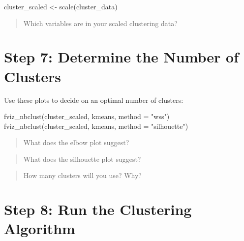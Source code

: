 \documentclass[
  11pt,
]{article}
\newenvironment{Shaded}{\begin{snugshade}}{\end{snugshade}}
\newcommand{\AttributeTok}[1]{\textcolor[rgb]{0.40,0.45,0.13}{#1}}
\newcommand{\FunctionTok}[1]{\textcolor[rgb]{0.28,0.35,0.67}{#1}}
\newcommand{\NormalTok}[1]{\textcolor[rgb]{0.00,0.23,0.31}{#1}}
\newcommand{\OtherTok}[1]{\textcolor[rgb]{0.00,0.23,0.31}{#1}}
\newcommand{\StringTok}[1]{\textcolor[rgb]{0.13,0.47,0.30}{#1}}
\begin{document}
\begin{Shaded}
\begin{Highlighting}[]
\NormalTok{cluster\_scaled }\OtherTok{\textless{}{-}} \FunctionTok{scale}\NormalTok{(cluster\_data)}
\end{Highlighting}
\end{Shaded}

\begin{quote}
Which variables are in your scaled clustering data?
\end{quote}

\vspace{2em}

\section*{Step 7: Determine the Number of
Clusters}\label{step-7-determine-the-number-of-clusters}

Use these plots to decide on an optimal number of clusters:

\begin{Shaded}
\begin{Highlighting}[]
\FunctionTok{fviz\_nbclust}\NormalTok{(cluster\_scaled, kmeans, }\AttributeTok{method =} \StringTok{"wss"}\NormalTok{)}
\FunctionTok{fviz\_nbclust}\NormalTok{(cluster\_scaled, kmeans, }\AttributeTok{method =} \StringTok{"silhouette"}\NormalTok{)}
\end{Highlighting}
\end{Shaded}

\begin{quote}
What does the elbow plot suggest?
\end{quote}

\vspace{2em}

\begin{quote}
What does the silhouette plot suggest?
\end{quote}

\vspace{2em}

\begin{quote}
How many clusters will you use? Why?
\end{quote}

\newpage

\section*{Step 8: Run the Clustering
Algorithm}\label{step-8-run-the-clustering-algorithm}
\end{document}
